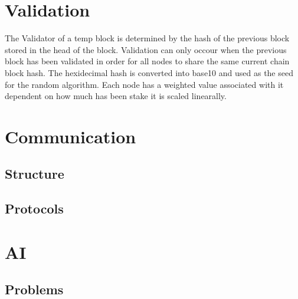 \documentclass[11pt]{extarticle}
\begin{document}
\section{Validation}
The Validator of a temp block is determined by the hash of the previous block stored in the head of the block. Validation can only occour when the previous block has been validated in order for all nodes to share the same current chain block hash. The hexidecimal hash is converted into base10 and used as the seed for the random algorithm. Each node has a weighted value associated with it dependent on how much has been stake it is scaled linearally.  
\section{Communication}
\subsection{Structure}
\subsection{Protocols}

\section{AI}
\subsection{Problems}



\end{document}

